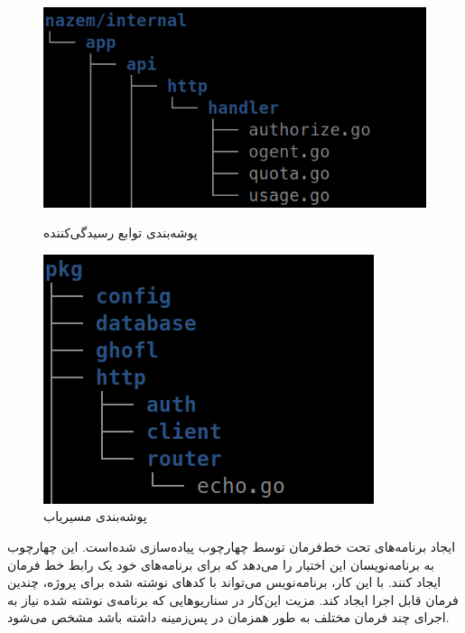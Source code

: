 \begin{figure}
	\vspace{1cm}
	\centering
	\begin{minipage}[b]{0.5\textwidth}
		\includegraphics[width=\textwidth]{figures/echo-handler-dir.png}
		\caption{پوشه‌بندی توابع رسیدگی‌کننده }
		\label{fig:echo-folder-handler}
	\end{minipage}
	\hfill
	\begin{minipage}[b]{0.4\textwidth}
		\includegraphics[width=\textwidth]{figures/echo-router-dir.png}
		\caption{پوشه‌بندی مسیریاب }
		\label{fig:echo-folder-router}
	\end{minipage}
	
\end{figure}


ایجاد برنامه‌های تحت خط‌فرمان توسط چهارچوب  پیاده‌سازی شده‌است. این چهارچوب به برنامه‌نویسان این اختیار ‌را می‌دهد که برای برنامه‌های خود یک رابط خط فرمان ایجاد کنند. با این کار، برنامه‌نویس می‌تواند با کد‌های نوشته شده برای پروژه، چندین فرمان قابل اجرا ایجاد کند. مزیت این‌کار در سناریو‌هایی که برنامه‌ی‌ نوشته شده نیاز به اجرای چند فرمان مختلف به طور همزمان در پس‌زمینه داشته باشد مشخص می‌شود.

